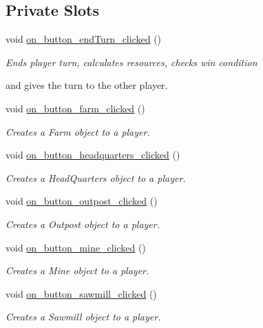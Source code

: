 \subsection*{Private Slots}
\begin{DoxyCompactItemize}
\item 
void \hyperlink{classMapWindow_ab60f0bbf2555d0ace96735e1c4c54044}{on\-\_\-button\-\_\-end\-Turn\-\_\-clicked} ()
\begin{DoxyCompactList}\small\item\em Ends player turn, calculates resources, checks win condition \par
and gives the turn to the other player. \end{DoxyCompactList}\item 
void \hyperlink{classMapWindow_a7f947a5bbf129046de9d7edcf8a2a33e}{on\-\_\-button\-\_\-farm\-\_\-clicked} ()
\begin{DoxyCompactList}\small\item\em Creates a Farm object to a player. \end{DoxyCompactList}\item 
void \hyperlink{classMapWindow_a973bab579c11c8ef96bbf2c4dd31e180}{on\-\_\-button\-\_\-headquarters\-\_\-clicked} ()
\begin{DoxyCompactList}\small\item\em Creates a Head\-Quarters object to a player. \end{DoxyCompactList}\item 
void \hyperlink{classMapWindow_a89aefb5bac34d02cdbf61786d7cad10f}{on\-\_\-button\-\_\-outpost\-\_\-clicked} ()
\begin{DoxyCompactList}\small\item\em Creates a Outpost object to a player. \end{DoxyCompactList}\item 
void \hyperlink{classMapWindow_ae1ea13a19d457aa8c4a8473c4a97e9b8}{on\-\_\-button\-\_\-mine\-\_\-clicked} ()
\begin{DoxyCompactList}\small\item\em Creates a Mine object to a player. \end{DoxyCompactList}\item 
void \hyperlink{classMapWindow_a6062e5222d28a89faa43f52667ebd600}{on\-\_\-button\-\_\-sawmill\-\_\-clicked} ()
\begin{DoxyCompactList}\small\item\em Creates a Sawmill object to a player. \end{DoxyCompactList}\item 

\end{DoxyCompactItemize}
